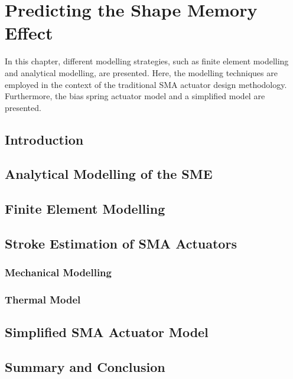 
\chapter{Predicting the Shape Memory Effect}\label{chap:sma-model}
In this chapter, different modelling strategies, such as finite element modelling and analytical modelling, are presented. Here, the modelling techniques are employed in the context of the traditional SMA actuator design methodology. Furthermore, the bias spring actuator model and a simplified model are presented.
\section{Introduction}
\section{Analytical Modelling of the SME}
\section{Finite Element Modelling}
\section{Stroke Estimation of SMA Actuators}
\subsection{Mechanical Modelling}
\subsection{Thermal Model}
\section{Simplified SMA Actuator Model}\label{sec:simplified-sma-model}
\section{Summary and Conclusion}
